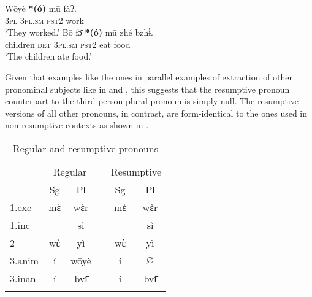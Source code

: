 \documentclass[output=paper]{langscibook}
\begin{document}
\ea\label{ex:johanneshein:3pl-insitu}
\begin{xlist}
\ex 
\gll Wōyè \textbf{*(ó)} mū fàʔ.\label{ex:johanneshein:3pl-insitu-a}\\
\textsc{3pl} \hphantom{(*}\textsc{3pl.sm} \textsc{pst2} work\\
\glt `They worked.'
\ex 
\gll Bō fɔ̄ \textbf{*(ó)} mū zhé bzhɨ́.\label{ex:johanneshein:3pl-insitu-b}\\
children \textsc{det} \hphantom{(*}\textsc{3pl.sm} \textsc{pst2} eat food\\
\glt `The children ate food.'
\end{xlist}
\z
Given that examples like the ones in  parallel examples of
extraction of other pronominal subjects like in
 and , this suggests
that the resumptive pronoun counterpart to the third person plural
pronoun is simply null. The resumptive versions of all other pronouns,
in contrast, are form-identical to the ones used in non-resumptive
contexts as shown in .

\begin{table}
\caption{Regular and resumptive pronouns}
\label{tab:johanneshein:regularandresumptive}
\begin{tabular}{lcclcc}
  \lsptoprule
  &\multicolumn{2}{c}{Regular}&&\multicolumn{2}{c}{Resumptive}\\
  \cmidrule{2-3}\cmidrule{5-6}
  &Sg&Pl&&Sg&Pl\\
  \midrule
  1.exc&mὲ&wὲr&&mὲ&wὲr\\
  1.inc&--&sì&&--&sì\\
  2&wὲ&yì&&wὲ&yì\\
  3.anim&í&wōyè&&í&$\varnothing$\\
  3.inan&í&bvɨ̄&&í&bvɨ̄\\
  \lspbottomrule
\end{tabular}
\end{table}
\end{document}
